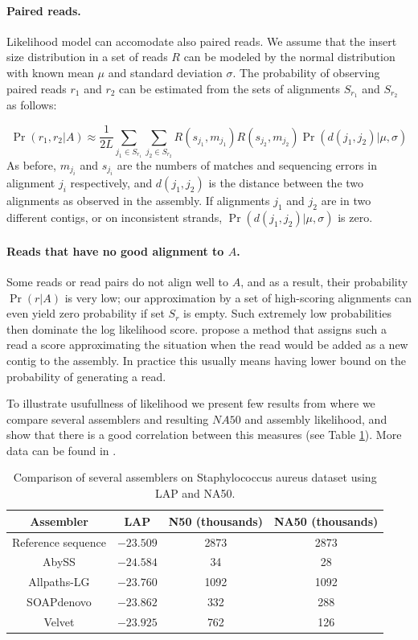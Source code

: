 \paragraph{Paired reads.}
Likelihood model can accomodate also paired reads.
We assume that the insert size distribution in a set of reads $R$ 
can be modeled by the normal
distribution with known mean $\mu$ and standard deviation $\sigma$.
The probability of observing paired reads $r_1$ and $r_2$ 
can be estimated from the sets of alignments $S_{r_1}$ and $S_{r_2}$ as follows:

\begin{equation}
\Pr(r_1, r_2|A) \approx 
\frac{1}{2L}
\displaystyle\sum_{j_1 \in S_{r_1}} 
\displaystyle\sum_{j_2 \in S_{r_2}} 
R(s_{j_1}, m_{j_1}) R(s_{j_2}, m_{j_2})
\Pr(d(j_1, j_2)|\mu, \sigma)
\end{equation}
As before, $m_{j_i}$ and $s_{j_i}$ are the numbers of matches and
sequencing errors in alignment $j_i$ respectively, 
and $d(j_1,j_2)$ is the distance between the two alignments
as observed in the assembly. 
If alignments $j_1$ and $j_2$ are in two different contigs,
or on inconsistent strands, $\Pr(d(j_1, j_2)|\mu, \sigma)$ is zero.

\paragraph{Reads that have no good alignment to $A$.}
Some reads or read pairs do not align well to $A$, and as a result, their
probability $\Pr(r|A)$ is very low; our approximation by a set of
high-scoring alignments can even yield zero probability if set $S_r$
is empty.  Such extremely low probabilities then dominate the log
likelihood score. \citet{Ghodsi2013} propose a method that assigns
such a read a score approximating the situation when the read would be
added as a new contig to the assembly. In practice this usually
means having lower bound on the probability of generating a read.

To illustrate usufullness of likelihood we present
few results from \citet{Ghodsi2013} where we compare
several assemblers and resulting $NA50$ and assembly likelihood,
and show that there is a good correlation between this measures (see Table
\ref{tab:like}). More data can be found in \citet{Ghodsi2013}.

\begin{table}
\centering
\begin{tabular}{|c|c|c|c|}
\hline
Assembler & LAP & N50 (thousands) & NA50 (thousands) \\\hline
Reference sequence & $-23.509$ & 2873 & 2873 \\\hline
AbySS & $-24.584$ & 34 & 28 \\\hline
Allpaths-LG & $-23.760$ & 1092 & 1092 \\\hline
SOAPdenovo & $-23.862$ & 332 & 288 \\\hline
Velvet & $-23.925$ & 762 & 126  \\\hline
\end{tabular}
\caption{Comparison of several assemblers on Staphylococcus aureus dataset
using LAP and NA50.}
\label{tab:like}
\end{table}

